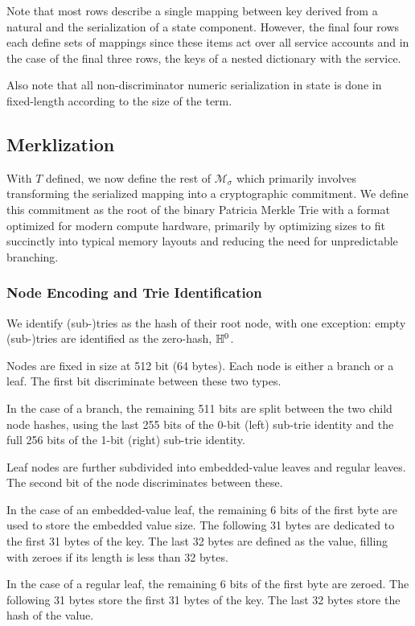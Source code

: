 Note that most rows describe a single mapping between key derived from a natural and the serialization of a state component. However, the final four rows each define sets of mappings since these items act over all service accounts and in the case of the final three rows, the keys of a nested dictionary with the service.

Also note that all non-discriminator numeric serialization in state is done in fixed-length according to the size of the term.

\subsection{Merklization}

With $T$ defined, we now define the rest of $\mathcal{M}_\sigma$ which primarily involves transforming the serialized mapping into a cryptographic commitment. We define this commitment as the root of the binary Patricia Merkle Trie with a format optimized for modern compute hardware, primarily by optimizing sizes to fit succinctly into typical memory layouts and reducing the need for unpredictable branching.

\subsubsection{Node Encoding and Trie Identification}
We identify (sub-)tries as the hash of their root node, with one exception: empty (sub-)tries are identified as the zero-hash, $\mathbb{H}^0$.

Nodes are fixed in size at 512 bit (64 bytes). Each node is either a branch or a leaf. The first bit discriminate between these two types.

In the case of a branch, the remaining 511 bits are split between the two child node hashes, using the last 255 bits of the 0-bit (left) sub-trie identity and the full 256 bits of the 1-bit (right) sub-trie identity.

Leaf nodes are further subdivided into embedded-value leaves and regular leaves. The second bit of the node discriminates between these.

In the case of an embedded-value leaf, the remaining 6 bits of the first byte are used to store the embedded value size. The following 31 bytes are dedicated to the first 31 bytes of the key. The last 32 bytes are defined as the value, filling with zeroes if its length is less than 32 bytes.

In the case of a regular leaf, the remaining 6 bits of the first byte are zeroed. The following 31 bytes store the first 31 bytes of the key. The last 32 bytes store the hash of the value.

